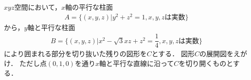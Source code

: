 \documentclass[../../main.tex]{subfiles}
\begin{document}
$xyz$空間において，$x$軸の平行な柱面
\begin{align*}
  A= \{ (x,y,z) | y^2+z^2=1,x,y,z\text{は実数} \}
\end{align*}
から，$y$軸と平行な柱面
\begin{align*}
  B = \{ (x,y,z) | x^2-\sqrt3xz+z^2=\dfrac{1}{4},x,y,z\text{は実数} \}
\end{align*}
により囲まれる部分を切り抜いた残りの図形を$C$とする．
図形$C$の展開図をえがけ．
ただし点$(0,1,0)$を通り$x$軸と平行な直線に沿って$C$を切り開くものとする．
\end{document}
